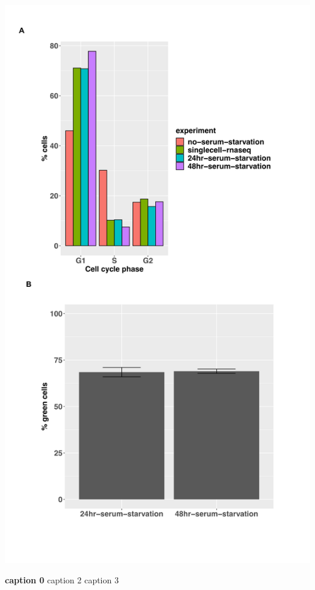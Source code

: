 \begin{suppfigure}[p]  
    \centering
    \includegraphics[width=\linewidth]{figures/hedgehog/SuppFigure9.png}
    \caption[caption1]{
        \textbf{caption 0}
        caption 2
        caption 3   
    }
    \label{fig:hh_figureS9}
\end{suppfigure}


